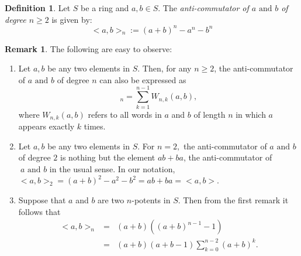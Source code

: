 \documentclass[12pt]{amsart}
\theoremstyle{definition}
\newtheorem{definition}[theorem]{Definition}
\newtheorem{remark}[theorem]{Remark}
\numberwithin{equation}{section}
\begin{document}

\begin{definition}\label{DEF: Anticommutator of Higher degree}
Let $S$ be a ring and $a,b \in S$. The \textit{anti-commutator of $a\text{ and }b$ of degree $n \ge 2$} is given by:
   $$<a,b>_n :=(a+b)^n-a^n-b^n$$
\end{definition}
\begin{remark} \label{remark on anti-commutator}
    The following are easy to observe:
    \begin{enumerate}
        \item Let $a,b $ be any two elements in $S$. Then, for any $n \geq 2$, the anti-commutator of $a\text{ and }b$ of degree $n$ can also be expressed as \[<a,b>_n = \sum\limits_{k=1}^{n-1}W_{n,k}(a,b),\]
where $W_{n,k}(a,b)$ refers to all words in $a$ and $b$ of length $n$ in which $a$ appears exactly $k$ times.
 
    \item Let $a,b $ be any two elements in $S$. For $n=2,$ the anti-commutator of $a \text{ and }b$ of degree $2$ is nothing but the element $ab+ba$, the anti-commutator of$\ a \text{ and }b$ in the usual sense. In our notation, $<a,b>_2=(a+b)^2-a^2-b^2=ab+ba=<a,b>$. 
    \item Suppose that $a$ and $b$ are two $n$-potents in $S$. Then from the first remark it follows that 
    \begin{eqnarray*}
        <a,b>_n &=& (a+b)((a+b)^{n-1}-1) \\
                &=& (a+b)(a+b-1)\sum\limits_{k=0}^{n-2}(a+b)^k.
    \end{eqnarray*}
    
 \end{enumerate}
\end{remark}
\end{document}
